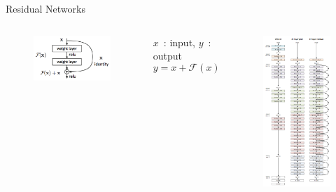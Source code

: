 \documentclass[handout, 10pt]{beamer}
\begin{document}
\begin{frame}{Residual Networks}
    \begin{columns}
        \begin{figure}
        \centering
        \includegraphics[width=.9\textwidth]{fig/L2/res_block.png}

    \end{figure}
    $x$~: input, $y$~: output
    $$
    y = x + \mathcal{F}(x) 
    $$
    \pause
            \begin{figure}
        \centering
        \includegraphics[height=.9\textheight,trim={4cm 0cm 0cm 0cm},clip]{fig/L2/resnet_full.png}

    \end{figure}
    \end{columns}
\end{frame}
\end{document}
